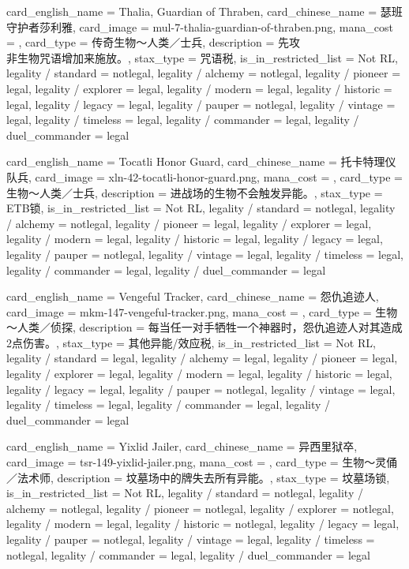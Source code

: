 \documentclass[lang = cn, color = black, 10pt]{AllThatStax}
\begin{document}
\card
{
	card_english_name = {Thalia, Guardian of Thraben},
	card_chinese_name = {瑟班守护者莎利雅},
	card_image = mul-7-thalia-guardian-of-thraben.png,
	mana_cost = ,
	card_type = 传奇生物～人类／士兵,
	description = {先攻\\
非生物咒语增加来施放。},
	stax_type = 咒语税,
	is_in_restricted_list = Not RL,
	legality / standard = notlegal,
	legality / alchemy = notlegal,
	legality / pioneer = legal,
	legality / explorer = legal,
	legality / modern = legal,
	legality / historic = legal,
	legality / legacy = legal,
	legality / pauper = notlegal,
	legality / vintage = legal,
	legality / timeless = legal,
	legality / commander = legal,
	legality / duel_commander = legal
}

\card
{
	card_english_name = {Tocatli Honor Guard},
	card_chinese_name = {托卡特理仪队兵},
	card_image = xln-42-tocatli-honor-guard.png,
	mana_cost = ,
	card_type = 生物～人类／士兵,
	description = {进战场的生物不会触发异能。},
	stax_type = ETB锁,
	is_in_restricted_list = Not RL,
	legality / standard = notlegal,
	legality / alchemy = notlegal,
	legality / pioneer = legal,
	legality / explorer = legal,
	legality / modern = legal,
	legality / historic = legal,
	legality / legacy = legal,
	legality / pauper = notlegal,
	legality / vintage = legal,
	legality / timeless = legal,
	legality / commander = legal,
	legality / duel_commander = legal
}

\card
{
	card_english_name = {Vengeful Tracker},
	card_chinese_name = {怨仇追迹人},
	card_image = mkm-147-vengeful-tracker.png,
	mana_cost = ,
	card_type = 生物～人类／侦探,
	description = {每当任一对手牺牲一个神器时，怨仇追迹人对其造成2点伤害。},
	stax_type = 其他异能/效应税,
	is_in_restricted_list = Not RL,
	legality / standard = legal,
	legality / alchemy = legal,
	legality / pioneer = legal,
	legality / explorer = legal,
	legality / modern = legal,
	legality / historic = legal,
	legality / legacy = legal,
	legality / pauper = notlegal,
	legality / vintage = legal,
	legality / timeless = legal,
	legality / commander = legal,
	legality / duel_commander = legal
}

\card
{
	card_english_name = {Yixlid Jailer},
	card_chinese_name = {异西里狱卒},
	card_image = tsr-149-yixlid-jailer.png,
	mana_cost = ,
	card_type = 生物～灵俑／法术师,
	description = {坟墓场中的牌失去所有异能。},
	stax_type = 坟墓场锁,
	is_in_restricted_list = Not RL,
	legality / standard = notlegal,
	legality / alchemy = notlegal,
	legality / pioneer = notlegal,
	legality / explorer = notlegal,
	legality / modern = legal,
	legality / historic = notlegal,
	legality / legacy = legal,
	legality / pauper = notlegal,
	legality / vintage = legal,
	legality / timeless = notlegal,
	legality / commander = legal,
	legality / duel_commander = legal
}
\end{document}
